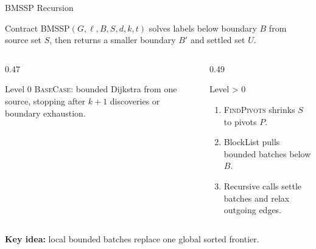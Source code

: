 \documentclass[aspectratio=169]{beamer}
\begin{document}
\begin{frame}{BMSSP Recursion}
  \footnotesize
  \begin{block}{Contract}
    \textsc{BMSSP}$(G,\ell,B,S,d,k,t)$ solves labels below boundary $B$ from source set $S$, then returns a smaller boundary $B'$ and settled set $U$.
  \end{block}

  \begin{columns}[T]
    \begin{column}{0.47\textwidth}
      \begin{exampleblock}{Level 0}
        \textsc{BaseCase}: bounded Dijkstra from one source, stopping after $k+1$ discoveries or boundary exhaustion.
      \end{exampleblock}
    \end{column}
    \begin{column}{0.49\textwidth}
      \begin{alertblock}{Level > 0}
        \begin{enumerate}
          \item \textsc{FindPivots} shrinks $S$ to pivots $P$.
          \item BlockList pulls bounded batches below $B$.
          \item Recursive calls settle batches and relax outgoing edges.
        \end{enumerate}
      \end{alertblock}
    \end{column}
  \end{columns}

  \vskip 4pt
  \textbf{Key idea:} local bounded batches replace one global sorted frontier.
\end{frame}
\end{document}

